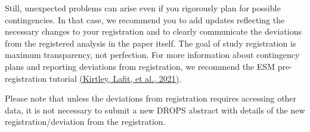 \documentclass[
]{article}
\begin{document}
Still, unexpected problems can arise even if you rigorously plan for
possible contingencies. In that case, we recommend you to add updates
reflecting the necessary changes to your registration and to clearly
communicate the deviations from the registered analysis in the paper
itself. The goal of study registration is maximum transparency, not
perfection. For more information about contingency plans and reporting
deviations from registration, we recommend the ESM pre-registration
tutorial \href{https://www.zotero.org/google-docs/?A6JUag}{(Kirtley,
Lafit, et al., 2021)}.

Please note that unless the deviations from registration requires
accessing other data, it is not necessary to submit a new DROPS abstract
with details of the new registration/deviation from the registration.
\end{document}
